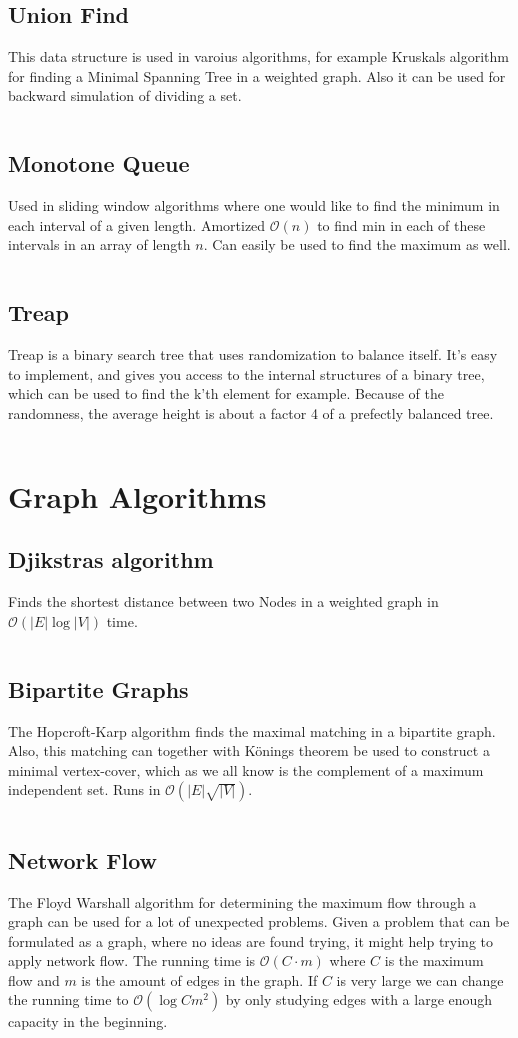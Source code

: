 \documentclass[8pt,a4paper,landscape,oneside]{amsart}
\newcommand{\code}[1]{\inputminted[fontsize=\normalsize,baselinestretch=1]{cpp}{code/#1}}
\newcommand{\bigO}{\mathcal{O}}
\begin{document}
\begin{multicols*}{3}
    \subsection{Union Find}
        This data structure is used in varoius algorithms, for example Kruskals algorithm for finding a Minimal Spanning Tree in a weighted graph. Also it can be used for backward simulation of dividing a set.
        \code{DS/UF.java}
    \subsection{Monotone Queue}
        Used in sliding window algorithms where one would like to find the minimum in each interval of a given length. Amortized $\bigO(n)$ to find min in each of these intervals in an array of length $n$. Can easily be used to find the maximum as well.
        \code{DS/MinMonQue.java}
    \subsection{Treap}
        Treap is a binary search tree that uses randomization to balance itself. 
        It's easy to implement, and gives you access to the internal structures of a binary tree, 
        which can be used to find the k'th element for example. Because of the randomness, the average height is about a factor 4 of a prefectly balanced tree.
        \code{DS/Treap.java}
\section{Graph Algorithms}
    \subsection{Djikstras algorithm}
        Finds the shortest distance between two Nodes in a weighted graph in $\bigO (|E| \log{|V|})$ time.
        \code{Graphs/Djikstra.java}
    \subsection{Bipartite Graphs}
        The Hopcroft-Karp algorithm finds the maximal matching in a bipartite graph. Also, this matching can together with Könings theorem be used to construct a minimal vertex-cover, which as we all know is the complement of a maximum independent set. Runs in $\bigO (|E|\sqrt{|V|})$. 
        \code{Graphs/BiGraph.java}
    \subsection{Network Flow}
        The Floyd Warshall algorithm for determining the maximum flow through a graph can be used for a lot of unexpected problems. Given a problem that can be formulated as a graph, where no ideas are found trying, it might help trying to apply network flow. The running time is $\bigO (C \cdot m)$ where $C$ is the maximum flow and $m$ is the amount of edges in the graph. 
        If $C$ is very large we can change the running time to $\bigO (\log{C}m^2)$ by only studying edges with a large enough capacity in the beginning.
        \code{Graphs/NetworkFlow.java}


\end{multicols*}
\end{document}
